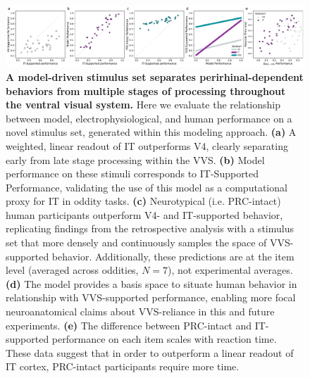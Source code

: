 \documentclass[11pt]{article}
\begin{document}
\begin{figure}[ht]
\centering
\includegraphics[width=\linewidth]{figures/novel_diagnostic_experiment}
\caption{\textbf{A model-driven stimulus set separates perirhinal-dependent behaviors from multiple stages of processing throughout the ventral visual system.} Here we evaluate the relationship between model, electrophysiological, and human performance on a novel stimulus set, generated within this modeling approach. \textbf{(a)} A weighted, linear readout of IT outperforms V4, clearly separating early from late stage processing within the VVS. \textbf{(b)} Model performance on these stimuli corresponds to IT-Supported Performance, validating the use of this model as a computational proxy for IT in oddity tasks. \textbf{(c)} Neurotypical (i.e. PRC-intact) human participants outperform V4- and IT-supported behavior, replicating findings from the retrospective analysis with a stimulus set that more densely and continuously samples the space of VVS-supported behavior. Additionally, these predictions are at the item level (averaged across oddities, $N=7$), not experimental averages. \textbf{(d)} The model provides a basis space to situate human behavior in relationship with VVS-supported performance, enabling more focal neuroanatomical claims about VVS-reliance in this and future experiments. \textbf{(e)} The difference between PRC-intact and IT-supported performance on each item scales with reaction time. These data suggest that in order to outperform a linear readout of IT cortex, PRC-intact participants require more time.}
\label{fig:novel_diagnostic}
\end{figure}
\end{document}

